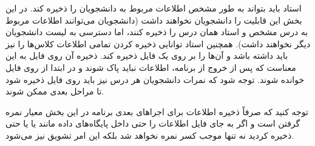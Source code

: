 استاد باید بتواند به طور مشخص اطلاعات مربوط به دانشجویان را ذخیره کند.  
در این بخش این قابلیت را دانشجویان نخواهند داشت (دانشجویان می‌توانند اطلاعات مربوط به درس مشخص و استاد همان درس را ذخیره کنند، اما دسترسی به لیست دانشجویان دیگر نخواهند داشت).  
همچنین استاد توانایی ذخیره کردن تمامی اطلاعات کلاس‌ها را نیز باید داشته باشد و آن‌ها را بر روی یک فایل ذخیره کند. ذخیره آن روی فایل به این معناست که پس از خروج از برنامه، اطلاعات نباید پاک شوند و در ابتدا از روی فایل خوانده شوند. توجه شود که نمرات دانشجویان هر درس نیز باید روی فایل ذخیره شود تا مراحل بعدی ممکن شوند.

توجه کنید که صرفاً ذخیره اطلاعات برای اجراهای بعدی برنامه در این بخش معیار نمره گرفتن است و اگر به جای فایل اطلاعات را حتی داخل پایگاه‌های داده مانند  یا  یا حتی  ذخیره کردید نه تنها موجب کسر نمره نخواهد شد بلکه این امر تشویق نیز می‌شود.